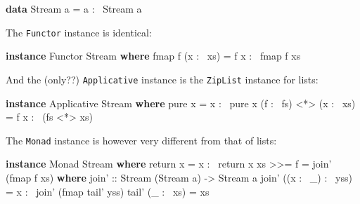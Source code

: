 \documentclass[]{article}
\newenvironment{Shaded}{}{}
\newcommand{\KeywordTok}[1]{\textcolor[rgb]{0.00,0.44,0.13}{\textbf{{#1}}}}
\newcommand{\DataTypeTok}[1]{\textcolor[rgb]{0.56,0.13,0.00}{{#1}}}
\newcommand{\OtherTok}[1]{\textcolor[rgb]{0.00,0.44,0.13}{{#1}}}
\newcommand{\FunctionTok}[1]{\textcolor[rgb]{0.02,0.16,0.49}{{#1}}}
\newcommand{\NormalTok}[1]{{#1}}
\begin{document}
\begin{Shaded}
\begin{Highlighting}[]
\KeywordTok{data} \DataTypeTok{Stream} \NormalTok{a }\FunctionTok{=} \NormalTok{a }\FunctionTok{:~} \DataTypeTok{Stream} \NormalTok{a}
\end{Highlighting}
\end{Shaded}

The \texttt{Functor} instance is identical:

\begin{Shaded}
\begin{Highlighting}[]
\KeywordTok{instance} \DataTypeTok{Functor} \DataTypeTok{Stream} \KeywordTok{where}
    \NormalTok{fmap f (x }\FunctionTok{:~} \NormalTok{xs) }\FunctionTok{=} \NormalTok{f x }\FunctionTok{:~} \NormalTok{fmap f xs}
\end{Highlighting}
\end{Shaded}

And the (only??) \texttt{Applicative} instance is the \texttt{ZipList} instance
for lists:

\begin{Shaded}
\begin{Highlighting}[]
\KeywordTok{instance} \DataTypeTok{Applicative} \DataTypeTok{Stream} \KeywordTok{where}
    \NormalTok{pure x }\FunctionTok{=} \NormalTok{x }\FunctionTok{:~} \NormalTok{pure x}
    \NormalTok{(f }\FunctionTok{:~} \NormalTok{fs) }\FunctionTok{<*>} \NormalTok{(x }\FunctionTok{:~} \NormalTok{xs) }\FunctionTok{=} \NormalTok{f x }\FunctionTok{:~} \NormalTok{(fs }\FunctionTok{<*>} \NormalTok{xs)}
\end{Highlighting}
\end{Shaded}

The \texttt{Monad} instance is however very different from that of lists:

\begin{Shaded}
\begin{Highlighting}[]
\KeywordTok{instance} \DataTypeTok{Monad} \DataTypeTok{Stream} \KeywordTok{where}
    \NormalTok{return x }\FunctionTok{=} \NormalTok{x }\FunctionTok{:~} \NormalTok{return x}
    \NormalTok{xs }\FunctionTok{>>=} \NormalTok{f }\FunctionTok{=} \NormalTok{join' (fmap f xs)}
      \KeywordTok{where}
\OtherTok{        join' ::} \DataTypeTok{Stream} \NormalTok{(}\DataTypeTok{Stream} \NormalTok{a) }\OtherTok{->} \DataTypeTok{Stream} \NormalTok{a}
        \NormalTok{join' ((x }\FunctionTok{:~} \NormalTok{_) }\FunctionTok{:~} \NormalTok{yss) }\FunctionTok{=} \NormalTok{x }\FunctionTok{:~} \NormalTok{join' (fmap tail' yss)}
        \NormalTok{tail' (_ }\FunctionTok{:~} \NormalTok{xs) }\FunctionTok{=} \NormalTok{xs}
\end{Highlighting}
\end{Shaded}
\end{document}
